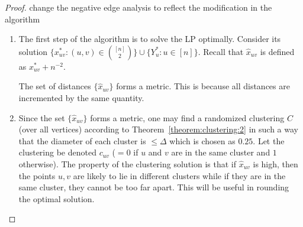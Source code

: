 \begin{proof}
{\color{red} change the negative edge analysis to reflect the modification in the algorithm}
\begin{enumerate}
	\item The first step of the algorithm is to solve the LP optimally. Consider its solution $\{ x_{uv}^* : (u,v) \in \binom{[n]}{2} \} \cup \{ Y_u^* : u \in [n]\}$. Recall that $\hat{x}_{uv}$ is defined as $x_{uv}^* + n^{-2}$.
	\begin{observation} The set of distances $\{ \hat{x}_{uv} \}$ forms a metric. This is because all distances are incremented by the same quantity.
	\end{observation}
	\item Since the set $\{ \hat{x}_{uv} \}$ forms a metric, one may find a randomized clustering $C$ (over all vertices) according to Theorem~\ref{theorem:clustering:2} in such a way that the diameter of each cluster is $\le \Delta$ which is chosen as $0.25$. Let the clustering be denoted $c_{uv}$ ($=0$ if $u$ and $v$ are in the same cluster and $1$ otherwise). The property of the clustering solution is that if $\hat{x}_{uv}$ is high, then the points $u,v$ are likely to lie in different clusters while if they are in the same cluster, they cannot be too far apart. This will be useful in rounding the optimal solution.


\end{enumerate}
\end{proof}
